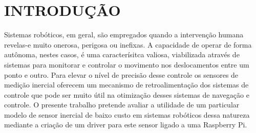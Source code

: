 \chapter{INTRODUÇÃO}
\label{chap:introducao}

Sistemas robóticos, em geral, são empregados quando a intervenção humana
revelas-e muito onerosa, perigosa ou inefixas. A capacidade de operar de forma
autônoma, nestes casos, é uma caracterísitca valiosa, viabilizada através de
sistemas para monitorar e controlar o movimento nos deslocamentos entre um
ponto e outro. Para elevar o nível de precisão desse controle os sensores de
medição inercial oferecem um mecanismo de retroalimentação dos sistemas de
controle que pode ser muito útil na otimização desses sistemas de navegação e
controle. O presente trabalho pretende avaliar a utilidade de um particular
modelo de sensor inercial de baixo custo em sistemas robóticos dessa natureza
mediante a criação de um driver para este sensor ligado a uma Raspberry Pi.
